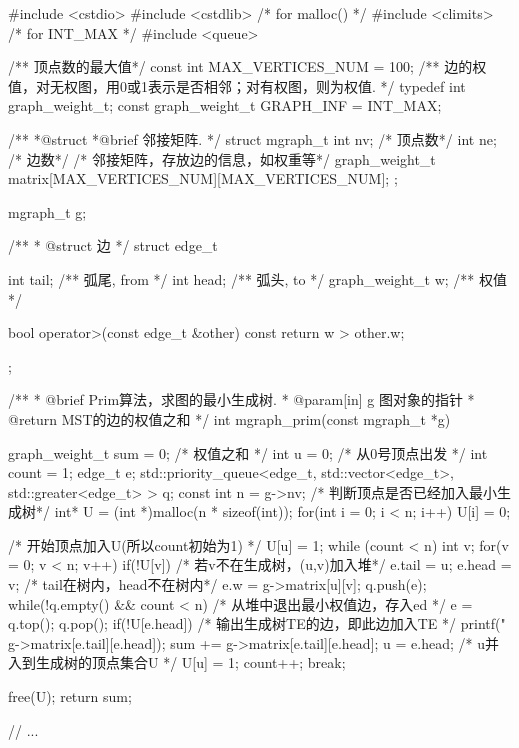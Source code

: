 \begin{Codex}[label=mgraph_prim2.cpp]
#include <cstdio>
#include <cstdlib>  /* for malloc() */
#include <climits>  /* for INT_MAX */
#include <queue>

/** 顶点数的最大值*/
const int MAX_VERTICES_NUM = 100;
/** 边的权值，对无权图，用0或1表示是否相邻；对有权图，则为权值. */
typedef int graph_weight_t;
const graph_weight_t GRAPH_INF = INT_MAX;

/**
 *@struct
 *@brief 邻接矩阵.
 */
struct mgraph_t {
    int nv; /* 顶点数*/
    int ne; /* 边数*/
    /* 邻接矩阵，存放边的信息，如权重等*/
    graph_weight_t matrix[MAX_VERTICES_NUM][MAX_VERTICES_NUM];
};

mgraph_t g;


/**
 * @struct 边
 */
struct edge_t{
    int tail;  /** 弧尾, from */
    int head;  /** 弧头, to */
    graph_weight_t w;  /** 权值 */

    bool operator>(const edge_t &other) const {
        return w > other.w;
    }
};

/**
  * @brief Prim算法，求图的最小生成树.
  * @param[in] g 图对象的指针
  * @return MST的边的权值之和
  */
int mgraph_prim(const mgraph_t *g){
    graph_weight_t sum = 0; /* 权值之和 */
    int u = 0; /* 从0号顶点出发 */
    int count = 1;
    edge_t e;
    std::priority_queue<edge_t, std::vector<edge_t>, std::greater<edge_t> > q;
    const int n = g->nv;
    /* 判断顶点是否已经加入最小生成树*/
    int* U = (int *)malloc(n * sizeof(int));
    for(int i = 0; i < n; i++) U[i] = 0;

    /* 开始顶点加入U(所以count初始为1) */
    U[u] = 1;
    while (count < n) {
        int v;
        for(v = 0; v < n; v++) if(!U[v]) { /* 若v不在生成树，(u,v)加入堆*/
            e.tail = u;
            e.head = v;
            /* tail在树内，head不在树内*/
            e.w = g->matrix[u][v];
            q.push(e);
        }
        while(!q.empty() && count < n) {
            /* 从堆中退出最小权值边，存入ed */
            e = q.top(); q.pop();
            if(!U[e.head]) {
                /* 输出生成树TE的边，即此边加入TE */
                printf("%
                        g->matrix[e.tail][e.head]);
                sum += g->matrix[e.tail][e.head];
                u = e.head;
                /* u并入到生成树的顶点集合U */
                U[u] = 1;
                count++;
                break;
            }
        }
    }

    free(U);
    return sum;
}

// ...
\end{Codex}

